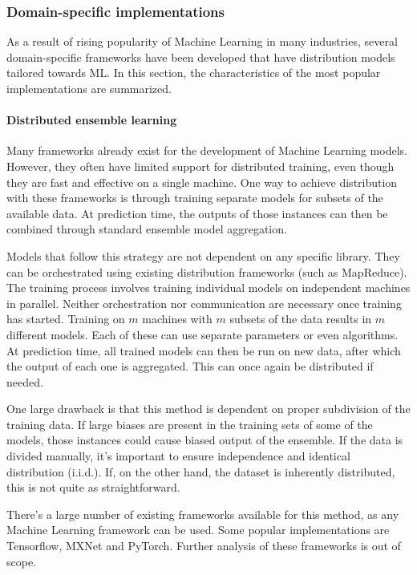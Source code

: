 \subsubsection{Domain-specific implementations}
As a result of rising popularity of Machine Learning in many industries, several domain-specific frameworks have been developed that have distribution models tailored towards ML. In this section, the characteristics of the most popular implementations are summarized.

\paragraph{Distributed ensemble learning}
Many frameworks already exist for the development of Machine Learning models. However, they often have limited support for distributed training, even though they are fast and effective on a single machine. One way to achieve distribution with these frameworks is through training separate models for subsets of the available data. At prediction time, the outputs of those instances can then be combined through standard ensemble model aggregation\citep{Opitz1999}.

Models that follow this strategy are not dependent on any specific library. They can be orchestrated using existing distribution frameworks (such as MapReduce\citet{MapReduce}). The training process involves training individual models on independent machines in parallel. Neither orchestration nor communication are necessary once training has started. Training on $m$ machines with $m$ subsets of the data results in $m$ different models. Each of these can use separate parameters or even algorithms. At prediction time, all trained models can then be run on new data, after which the output of each one is aggregated. This can once again be distributed if needed.

One large drawback is that this method is dependent on proper subdivision of the training data. If large biases are present in the training sets of some of the models, those instances could cause biased output of the ensemble. If the data is divided manually, it's important to ensure independence and identical distribution (i.i.d.). If, on the other hand, the dataset is inherently distributed, this is not quite as straightforward.

There's a large number of existing frameworks available for this method, as any Machine Learning framework can be used. Some popular implementations are Tensorflow\citep{Tensorflow2015}, MXNet\citep{MXNet2015} and PyTorch\citep{PyTorch2017}. Further analysis of these frameworks is out of scope.

